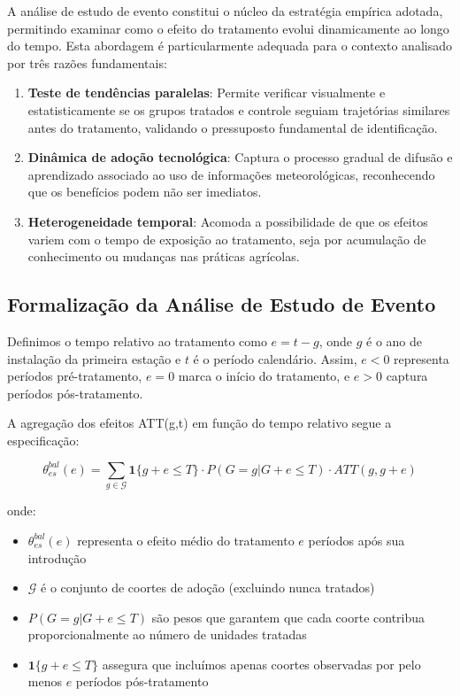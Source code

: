 \documentclass[
	12pt,				%
	oneside,			%
	a4paper,			%
	english,			%
	french,				%
	spanish,			%
	brazil				%
	]{abntex2}
\begin{document}
A análise de estudo de evento constitui o núcleo da estratégia empírica adotada, permitindo examinar como o efeito do tratamento evolui dinamicamente ao longo do tempo. Esta abordagem é particularmente adequada para o contexto analisado por três razões fundamentais:

\begin{enumerate}
\item \textbf{Teste de tendências paralelas}: Permite verificar visualmente e estatisticamente se os grupos tratados e controle seguiam trajetórias similares antes do tratamento, validando o pressuposto fundamental de identificação.

\item \textbf{Dinâmica de adoção tecnológica}: Captura o processo gradual de difusão e aprendizado associado ao uso de informações meteorológicas, reconhecendo que os benefícios podem não ser imediatos.

\item \textbf{Heterogeneidade temporal}: Acomoda a possibilidade de que os efeitos variem com o tempo de exposição ao tratamento, seja por acumulação de conhecimento ou mudanças nas práticas agrícolas.
\end{enumerate}

\subsection{Formalização da Análise de Estudo de Evento}

Definimos o tempo relativo ao tratamento como $e = t - g$, onde $g$ é o ano de instalação da primeira estação e $t$ é o período calendário. Assim, $e < 0$ representa períodos pré-tratamento, $e = 0$ marca o início do tratamento, e $e > 0$ captura períodos pós-tratamento.

A agregação dos efeitos ATT(g,t) em função do tempo relativo segue a especificação:

\begin{equation}
\theta_{es}^{bal}(e) = \sum_{g \in \mathcal{G}} \mathbf{1}\{g + e \leq T\} \cdot P(G = g | G + e \leq T) \cdot ATT(g, g+e)
\end{equation}

onde:
\begin{itemize}
\item $\theta_{es}^{bal}(e)$ representa o efeito médio do tratamento $e$ períodos após sua introdução
\item $\mathcal{G}$ é o conjunto de coortes de adoção (excluindo nunca tratados)
\item $P(G = g | G + e \leq T)$ são pesos que garantem que cada coorte contribua proporcionalmente ao número de unidades tratadas
\item $\mathbf{1}\{g + e \leq T\}$ assegura que incluímos apenas coortes observadas por pelo menos $e$ períodos pós-tratamento
\end{itemize}
\end{document}
